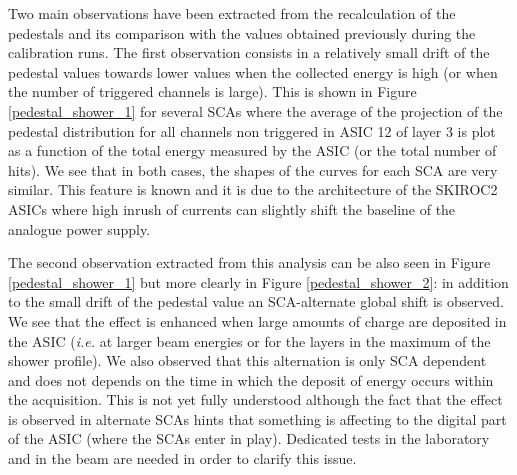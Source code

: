 \documentclass[a4paper,11pt]{article}
\begin{document}
Two main observations have been extracted from the recalculation of the pedestals and its comparison
with the values obtained previously during the calibration runs. The first observation
consists in a relatively small 
drift of the pedestal values
towards lower values when the collected energy is high (or when the number of triggered channels is large).
This is shown in Figure \ref{pedestal_shower_1} for several SCAs where the
average of the projection of the pedestal distribution for all channels non triggered in ASIC 12 of layer 3 
is plot as a function of the total energy measured by the ASIC (or the total number of hits).
We see that in both cases, the shapes of the curves 
for each SCA are very similar.
This feature is known and it is due to the architecture of the SKIROC2 ASICs 
where high inrush of currents can slightly shift the baseline of the analogue power supply. 

The second observation extracted from this analysis can be also seen in Figure \ref{pedestal_shower_1} but
more clearly in Figure \ref{pedestal_shower_2}: in addition
to the small drift of the pedestal value an SCA-alternate global shift
is observed. We see that the effect is enhanced when large amounts of charge
are deposited in the ASIC ({\it i.e.} at larger beam energies or for the layers in the maximum of the shower
profile). We also observed that this alternation is only SCA dependent and does not depends
on the time in which the deposit of energy occurs within the acquisition.
This is not yet fully understood although the fact that the effect is observed in
alternate SCAs hints that something is affecting to the digital part of the ASIC 
(where the SCAs enter in play).
Dedicated tests in the laboratory and in the beam are needed in order to clarify this issue.
\end{document}

